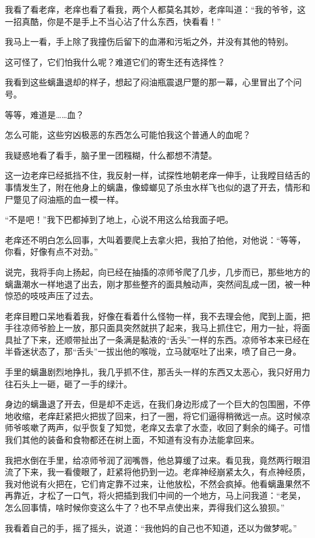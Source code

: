 我看了看老痒，老痒也看了看我，两个人都莫名其妙，老痒叫道：“我的爷爷，这一招真酷，你是不是手上不当心沾了什么东西，快看看！”

我马上一看，手上除了我撞伤后留下的血滞和污垢之外，并没有其他的特别。

这可怪了，它们怕我什么呢？难道它们的寄生还有选择性？

我看到这些螭蛊退却的样子，想起了闷油瓶震退尸蹩的那一幕，心里冒出了个问号。

等等，难道是……血？

怎么可能，这些穷凶极恶的东西怎么可能怕我这个普通人的血呢？

我疑惑地看了看手，脑子里一团糨糊，什么都想不清楚。

这一边老痒已经抵挡不住，我反射一样，试探性地朝老痒一伸手，让我瞠目结舌的事情发生了，附在他身上的螭蛊，像蟑螂见了杀虫水样飞也似的退了开去，情形和尸蹩见了闷油瓶的血一模一样。

“不是吧！”我下巴都掉到了地上，心说不用这么给我面子吧。

老痒还不明白怎么回事，大叫着要爬上去拿火把，我拍了拍他，对他说：“等等，你看，好像有点不对劲。”

说完，我将手向上扬起，向已经在抽搐的凉师爷爬了几步，几步而已，那些地方的螭蛊潮水一样地退了出去，刚才那些整齐的面具触动声，突然间乱成一团，被一种惊恐的吱吱声压了过去。

老痒目瞪口呆地看着我，好像在看着什么怪物一样，我不去理会他，爬到上面，把手往凉师爷脸上一放，那只面具突然就拱了起来，我马上抓住它，用力一扯，将面具扯了下来，还顺带扯出了一条满是黏液的“舌头”一样的东西。凉师爷本来已经在半昏迷状态了，那“舌头”一拔出他的喉咙，立马就呕吐了出来，喷了自己一身。

手里的螭蛊剧烈地挣扎，我几乎抓不住，那舌头一样的东西又太恶心，我只好用力往石头上一砸，砸了一手的绿汁。

身边的螭蛊退了开去，但是却不走远，在我们身边形成了一个巨大的包围圈，不停地收缩，老痒赶紧把火把拔了回来，扫了一圈，将它们逼得稍微远一点。这时候凉师爷咳嗽了两声，似乎恢复了知觉，老痒又去拿了水壶，收回了剩余的绳子。可惜我们其他的装备和食物都还在树上面，不知道有没有办法能拿回来。

我把水倒在手里，给凉师爷润了润嘴唇，他总算缓了过来。看见我，竟然两行眼泪流了下来，我一看傻眼了，赶紧将他扔到一边。老痒神经崩紧太久，有点神经质，我对他说有火把在，它们肯定靠不过来，让他放松，不然会疯掉。他看螭蛊果然不再靠近，才松了一口气，将火把插到我们中间的一个地方，马上问我道：“老吴，怎么回事情，啥时候你变这么牛了？也不早点使出来，弄得我们这么狼狈。”

我看着自己的手，摇了摇头，说道：“我他妈的自己也不知道，还以为做梦呢。”

